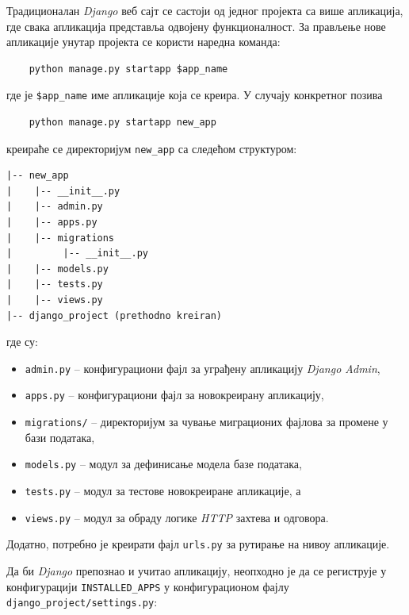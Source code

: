 \documentclass[12pt,oneside]{memoir}
\begin{document}
Традиционалан \textit{Django} веб сајт се састоји од једног пројекта са више апликација, где свака апликација представља одвојену функционалност.
За прављење нове апликације унутар пројекта се користи наредна команда:

\begin{lstlisting}
    python manage.py startapp $app_name
\end{lstlisting}
где је \texttt{\$app\_name} име апликације која се креира. У случају конкретног позива
\begin{lstlisting}
    python manage.py startapp new_app
\end{lstlisting}
креираће се директоријум \texttt{new\_app} са следећом структуром:
\begin{lstlisting}
|-- new_app
|    |-- __init__.py
|    |-- admin.py
|    |-- apps.py
|    |-- migrations
|         |-- __init__.py
|    |-- models.py
|    |-- tests.py
|    |-- views.py
|-- django_project (prethodno kreiran)
\end{lstlisting}

где су:
\begin{itemize}[--]
    \item \texttt{admin.py} -- конфигурациони фајл за уграђену апликацију \textit{Django Admin},
    \item \texttt{apps.py} -- конфигурациони фајл за новокреирану апликацију,
    \item \texttt{migrations/} -- директоријум за чување миграционих фајлова за промене у бази података,
    \item \texttt{models.py} -- модул за дефинисање модела базе података,
    \item \texttt{tests.py} -- модул за тестове новокреиране апликације, а
    \item \texttt{views.py} -- модул за обраду логике \textit{HTTP} захтева и одговора.
\end{itemize}

Додатно, потребно је креирати фајл \texttt{urls.py} за рутирање на нивоу апликације.


Да би \textit{Django} препознао и учитао апликацију, неопходно је да се региструје у конфигурацији \texttt{INSTALLED\_APPS} у конфигурационом фајлу \\
\texttt{django\_project/settings.py}: \\
\end{document}
